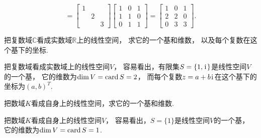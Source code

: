 \begin{example}
\begin{solution}
\[	= \begin{bmatrix}
		1 \\
		& 2 \\
		&& 3
	\end{bmatrix} \begin{bmatrix}
		1 & 0 & 1 \\
		1 & 1 & 0 \\
		0 & 1 & 1
	\end{bmatrix}
	= \begin{bmatrix}
		1 & 0 & 1 \\
		2 & 2 & 0 \\
		0 & 3 & 3
	\end{bmatrix}.
\]
\end{solution}
\end{example}

\begin{example}
把复数域\(\mathbb{C}\)看成实数域\(\mathbb{R}\)上的线性空间，
求它的一个基和维数，
以及每个复数在这个基下的坐标.
\begin{solution}
把复数域看成实数域上的线性空间\(V\)，
容易看出，有限集\(S = \{1,\kern1pt\mathrm{i}\kern1pt\}\)是线性空间\(V\)的一个基，
它的维数为\(\dim V = \operatorname{card} S = 2\)，
而每个复数\(z = a + b\kern1pt\mathrm{i}\kern1pt\)在这个基下的坐标为\((a,b)^T\).
\end{solution}
\end{example}

\begin{example}
把数域\(K\)看成自身上的线性空间，求它的一个基和维数.
\begin{solution}
把数域\(K\)看成自身上的线性空间\(V\)，
容易看出，\(S = \{1\}\)是线性空间\(V\)的一个基，
它的维数为\(\dim V = \operatorname{card} S = 1\).
\end{solution}
\end{example}
